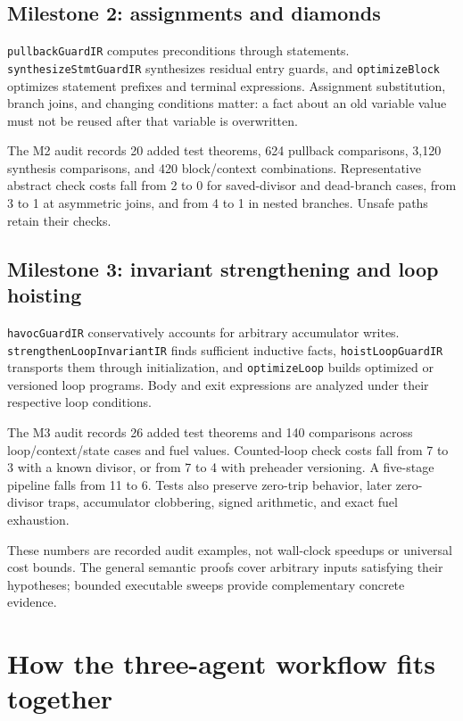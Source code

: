 \documentclass[11pt]{article}
\begin{document}
\subsection*{Milestone 2: assignments and diamonds}

\texttt{pullbackGuardIR} computes preconditions through statements. \texttt{synthesizeStmtGuardIR} synthesizes residual entry guards, and \texttt{optimizeBlock} optimizes statement prefixes and terminal expressions. Assignment substitution, branch joins, and changing conditions matter: a fact about an old variable value must not be reused after that variable is overwritten.

The M2 audit records 20 added test theorems, 624 pullback comparisons, 3,120 synthesis comparisons, and 420 block/context combinations. Representative abstract check costs fall from 2 to 0 for saved-divisor and dead-branch cases, from 3 to 1 at asymmetric joins, and from 4 to 1 in nested branches. Unsafe paths retain their checks.

\subsection*{Milestone 3: invariant strengthening and loop hoisting}

\texttt{havocGuardIR} conservatively accounts for arbitrary accumulator writes. \texttt{strengthenLoopInvariantIR} finds sufficient inductive facts, \texttt{hoistLoopGuardIR} transports them through initialization, and \texttt{optimizeLoop} builds optimized or versioned loop programs. Body and exit expressions are analyzed under their respective loop conditions.

The M3 audit records 26 added test theorems and 140 comparisons across loop/context/state cases and fuel values. Counted-loop check costs fall from 7 to 3 with a known divisor, or from 7 to 4 with preheader versioning. A five-stage pipeline falls from 11 to 6. Tests also preserve zero-trip behavior, later zero-divisor traps, accumulator clobbering, signed arithmetic, and exact fuel exhaustion.

These numbers are recorded audit examples, not wall-clock speedups or universal cost bounds. The general semantic proofs cover arbitrary inputs satisfying their hypotheses; bounded executable sweeps provide complementary concrete evidence.

\section*{How the three-agent workflow fits together}
\end{document}
